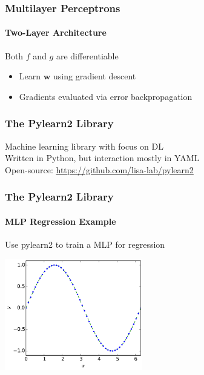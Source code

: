 \documentclass[xetex,professionalfont]{beamer}
\renewcommand{\vec}[1]{\ensuremath{\mathbf{#1}}}
\newcommand{\vw}{\vec{w}}
\begin{document}

\begin{frame}
\frametitle{Multilayer Perceptrons}
\framesubtitle{Two-Layer Architecture}

Both $f$ and $g$ are differentiable
\begin{itemize}
	\item Learn $\vw$ using gradient descent %
	\item Gradients evaluated via error backpropagation %
\end{itemize}

\end{frame}


\begin{frame}
\frametitle{The Pylearn2 Library}

Machine learning library with focus on DL\\\medskip
Written in Python, but interaction mostly in YAML\\\medskip
Open-source: \url{https://github.com/lisa-lab/pylearn2}

\end{frame}


\begin{frame}
\frametitle{The Pylearn2 Library}
\framesubtitle{MLP Regression Example}

Use pylearn2 to train a MLP for regression

\medskip
\begin{center}
	\includegraphics[width=6cm]{figures/mlp-input.pdf} %
\end{center}

\end{frame}
\end{document}
